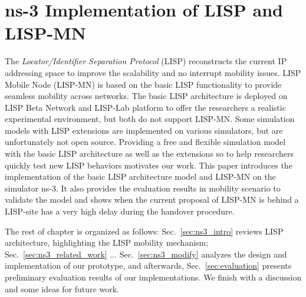 
\chapter{ns-3 Implementation of LISP and LISP-MN}
\label{cha:ns-3}

\ifpdf
    \graphicspath{{Chapter7/Pics/Raster/}{Chapter7/Pics/PDF/}{Chapter7/}}
\else
    \graphicspath{{Chapter7/Pics/Vector/}{Chapter7/}}
\fi

The \emph{Locator/Identifier Separation Protocol} (LISP) reconstructs the current IP addressing space to improve the scalability and no interrupt mobility issues. LISP Mobile Node (LISP-MN) is based on the basic LISP functionality to provide seamless mobility across networks. The basic LISP architecture is deployed on LISP Beta Network and LISP-Lab platform to offer the researchers a realistic experimental environment, but both do not support LISP-MN. Some simulation models with LISP extensions are implemented on various simulators, but are unfortunately not open source. Providing a free and flexible simulation model with the basic LISP architecture as well as the extensions so to help researchers quickly test new LISP behaviors motivates our work. This paper introduces the implementation of the basic LISP architecture model and LISP-MN on the simulator ns-3. It also provides the evaluation results in mobility scenario to validate the model and shows when the current proposal of LISP-MN is behind a LISP-site has a very high delay during the handover procedure.

The rest of chapter is organized as follows: Sec.~\ref{sec:ns3_intro} reviews LISP architecture, highlighting the LISP mobility mechanism; Sec.~\ref{sec:ns3_related_work} ... Sec.~\ref{sec:ns3_modify} analyzes the design and implementation of our prototype, and afterwards, Sec.~\ref{sec:evaluation} presents preliminary evaluation results of our implementations. We finish with a discussion and some ideas for future work.

